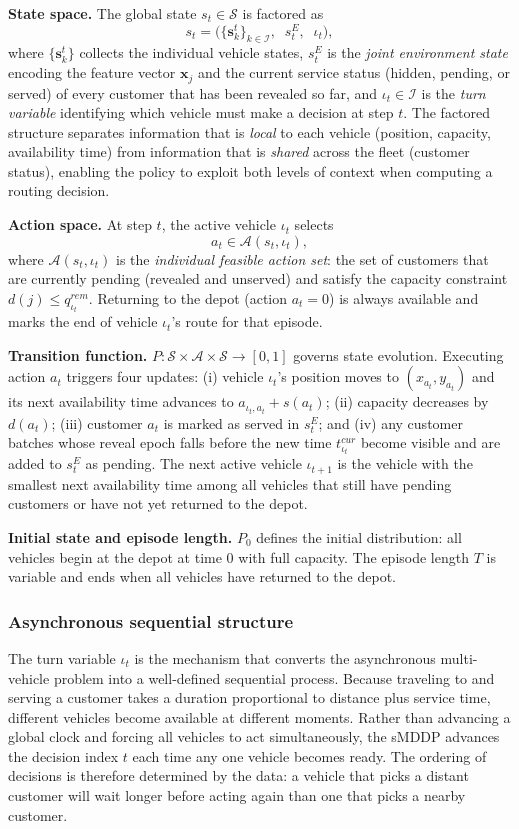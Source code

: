 \documentclass[conference]{IEEEtran}
\begin{document}
\smallskip\noindent\textbf{State space.}
The global state $s_t \in \mathcal{S}$ is factored as
\[
s_t = \bigl(\{\mathbf{s}_k^t\}_{k \in \mathcal{I}},\;\; s_t^E,\;\; \iota_t\bigr),
\]
where $\{\mathbf{s}_k^t\}$ collects the individual vehicle states, $s_t^E$ is the \emph{joint environment state} encoding the feature vector $\mathbf{x}_j$ and the current service status (hidden, pending, or served) of every customer that has been revealed so far, and $\iota_t \in \mathcal{I}$ is the \emph{turn variable} identifying which vehicle must make a decision at step $t$.
The factored structure separates information that is \emph{local} to each vehicle (position, capacity, availability time) from information that is \emph{shared} across the fleet (customer status), enabling the policy to exploit both levels of context when computing a routing decision.

\smallskip\noindent\textbf{Action space.}
At step $t$, the active vehicle $\iota_t$ selects
\[
a_t \in \mathcal{A}(s_t, \iota_t),
\]
where $\mathcal{A}(s_t, \iota_t)$ is the \emph{individual feasible action set}: the set of customers that are currently pending (revealed and unserved) and satisfy the capacity constraint $d(j) \leq q^{rem}_{\iota_t}$.
Returning to the depot (action $a_t = 0$) is always available and marks the end of vehicle $\iota_t$'s route for that episode.

\smallskip\noindent\textbf{Transition function.}
$P : \mathcal{S} \times \mathcal{A} \times \mathcal{S} \to [0,1]$ governs state evolution.
Executing action $a_t$ triggers four updates: (i) vehicle $\iota_t$'s position moves to $(x_{a_t}, y_{a_t})$ and its next availability time advances to $a_{\iota_t, a_t} + s(a_t)$; (ii) capacity decreases by $d(a_t)$; (iii) customer $a_t$ is marked as served in $s_t^E$; and (iv) any customer batches whose reveal epoch falls before the new time $t^{cur}_{\iota_t}$ become visible and are added to $s_t^E$ as pending.
The next active vehicle $\iota_{t+1}$ is the vehicle with the smallest next availability time among all vehicles that still have pending customers or have not yet returned to the depot.

\smallskip\noindent\textbf{Initial state and episode length.}
$P_0$ defines the initial distribution: all vehicles begin at the depot at time $0$ with full capacity.
The episode length $T$ is variable and ends when all vehicles have returned to the depot.

\subsubsection{Asynchronous sequential structure}
The turn variable $\iota_t$ is the mechanism that converts the asynchronous multi-vehicle problem into a well-defined sequential process.
Because traveling to and serving a customer takes a duration proportional to distance plus service time, different vehicles become available at different moments.
Rather than advancing a global clock and forcing all vehicles to act simultaneously, the sMDDP advances the decision index $t$ each time any one vehicle becomes ready.
The ordering of decisions is therefore determined by the data: a vehicle that picks a distant customer will wait longer before acting again than one that picks a nearby customer.
\end{document}
